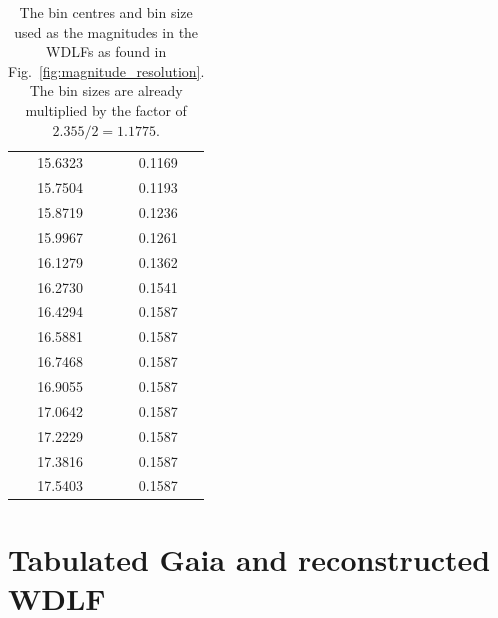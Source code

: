 \documentclass[fleqn,usenatbib]{mnras}
\begin{document}
\begin{table}
\begin{tabular}{c|c}
        15.6323 & 0.1169\\
        15.7504 & 0.1193\\
        15.8719 & 0.1236\\
        15.9967 & 0.1261\\\hline
        16.1279 & 0.1362\\
        16.2730 & 0.1541\\
        16.4294 & 0.1587\\
        16.5881 & 0.1587\\
        16.7468 & 0.1587\\\hline
        16.9055 & 0.1587\\
        17.0642 & 0.1587\\
        17.2229 & 0.1587\\
        17.3816 & 0.1587\\
        17.5403 & 0.1587\\\hline
            \end{tabular}
    \caption{The bin centres and bin size used as the magnitudes in the WDLFs
    as found in Fig.~\ref{fig:magnitude_resolution}. The bin sizes are already 
    multiplied by the factor of $2.355 /2 = 1.1775$.}
    \label{tab:magnitude_resolution}
\end{table}

\section{Tabulated Gaia and reconstructed WDLF}
\label{appexdix:reconstructed-wdlf}
\end{document}
